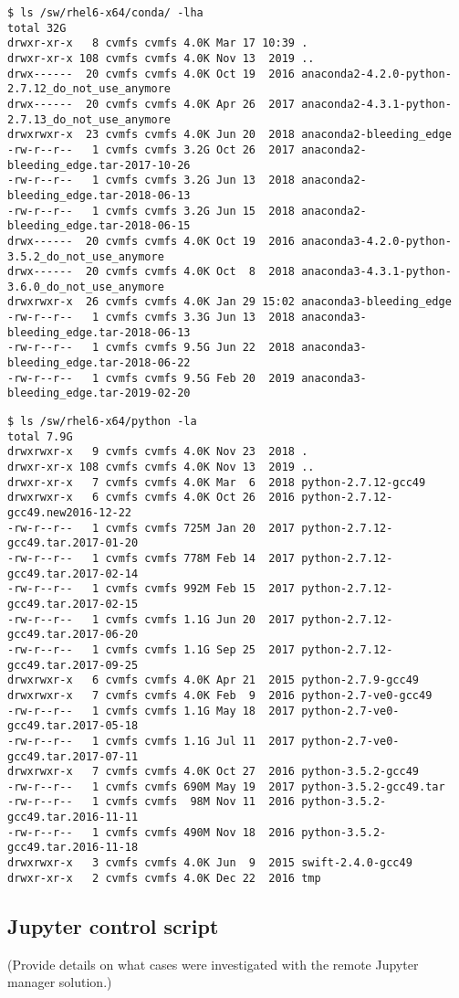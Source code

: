 \begin{verbatim}
$ ls /sw/rhel6-x64/conda/ -lha
total 32G
drwxr-xr-x   8 cvmfs cvmfs 4.0K Mar 17 10:39 .
drwxr-xr-x 108 cvmfs cvmfs 4.0K Nov 13  2019 ..
drwx------  20 cvmfs cvmfs 4.0K Oct 19  2016 anaconda2-4.2.0-python-2.7.12_do_not_use_anymore
drwx------  20 cvmfs cvmfs 4.0K Apr 26  2017 anaconda2-4.3.1-python-2.7.13_do_not_use_anymore
drwxrwxr-x  23 cvmfs cvmfs 4.0K Jun 20  2018 anaconda2-bleeding_edge
-rw-r--r--   1 cvmfs cvmfs 3.2G Oct 26  2017 anaconda2-bleeding_edge.tar-2017-10-26
-rw-r--r--   1 cvmfs cvmfs 3.2G Jun 13  2018 anaconda2-bleeding_edge.tar-2018-06-13
-rw-r--r--   1 cvmfs cvmfs 3.2G Jun 15  2018 anaconda2-bleeding_edge.tar-2018-06-15
drwx------  20 cvmfs cvmfs 4.0K Oct 19  2016 anaconda3-4.2.0-python-3.5.2_do_not_use_anymore
drwx------  20 cvmfs cvmfs 4.0K Oct  8  2018 anaconda3-4.3.1-python-3.6.0_do_not_use_anymore
drwxrwxr-x  26 cvmfs cvmfs 4.0K Jan 29 15:02 anaconda3-bleeding_edge
-rw-r--r--   1 cvmfs cvmfs 3.3G Jun 13  2018 anaconda3-bleeding_edge.tar-2018-06-13
-rw-r--r--   1 cvmfs cvmfs 9.5G Jun 22  2018 anaconda3-bleeding_edge.tar-2018-06-22
-rw-r--r--   1 cvmfs cvmfs 9.5G Feb 20  2019 anaconda3-bleeding_edge.tar-2019-02-20
\end{verbatim}

\begin{verbatim}
$ ls /sw/rhel6-x64/python -la
total 7.9G
drwxrwxr-x   9 cvmfs cvmfs 4.0K Nov 23  2018 .
drwxr-xr-x 108 cvmfs cvmfs 4.0K Nov 13  2019 ..
drwxr-xr-x   7 cvmfs cvmfs 4.0K Mar  6  2018 python-2.7.12-gcc49
drwxrwxr-x   6 cvmfs cvmfs 4.0K Oct 26  2016 python-2.7.12-gcc49.new2016-12-22
-rw-r--r--   1 cvmfs cvmfs 725M Jan 20  2017 python-2.7.12-gcc49.tar.2017-01-20
-rw-r--r--   1 cvmfs cvmfs 778M Feb 14  2017 python-2.7.12-gcc49.tar.2017-02-14
-rw-r--r--   1 cvmfs cvmfs 992M Feb 15  2017 python-2.7.12-gcc49.tar.2017-02-15
-rw-r--r--   1 cvmfs cvmfs 1.1G Jun 20  2017 python-2.7.12-gcc49.tar.2017-06-20
-rw-r--r--   1 cvmfs cvmfs 1.1G Sep 25  2017 python-2.7.12-gcc49.tar.2017-09-25
drwxrwxr-x   6 cvmfs cvmfs 4.0K Apr 21  2015 python-2.7.9-gcc49
drwxrwxr-x   7 cvmfs cvmfs 4.0K Feb  9  2016 python-2.7-ve0-gcc49
-rw-r--r--   1 cvmfs cvmfs 1.1G May 18  2017 python-2.7-ve0-gcc49.tar.2017-05-18
-rw-r--r--   1 cvmfs cvmfs 1.1G Jul 11  2017 python-2.7-ve0-gcc49.tar.2017-07-11
drwxrwxr-x   7 cvmfs cvmfs 4.0K Oct 27  2016 python-3.5.2-gcc49
-rw-r--r--   1 cvmfs cvmfs 690M May 19  2017 python-3.5.2-gcc49.tar
-rw-r--r--   1 cvmfs cvmfs  98M Nov 11  2016 python-3.5.2-gcc49.tar.2016-11-11
-rw-r--r--   1 cvmfs cvmfs 490M Nov 18  2016 python-3.5.2-gcc49.tar.2016-11-18
drwxrwxr-x   3 cvmfs cvmfs 4.0K Jun  9  2015 swift-2.4.0-gcc49
drwxr-xr-x   2 cvmfs cvmfs 4.0K Dec 22  2016 tmp
\end{verbatim}

\subsection{Jupyter control script}

(Provide details on what cases were investigated with the remote Jupyter manager solution.)
